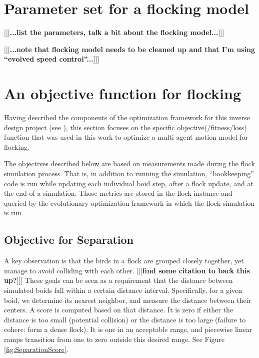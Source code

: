 \documentclass[letterpaper]{article}
\begin{document}
\section{Parameter set for a flocking model}
\label{sec:parameter_set}

[[[\textbf{...list the parameters, talk a bit about the flocking model...}]]]

[[[\textbf{...note that flocking model needs to be cleaned up and that I'm using ``evolved speed control''...}]]]

\section{An objective function for flocking}
\label{sec:FlockingObjective}

Having described the components of the optimization framework for this inverse design project (see ), this section focuses on the specific objective(/fitness/loss) function that was used in this work to optimize a multi-agent motion model for flocking.

The objectives described below are based on measurements made during the flock simulation process. That is, in addition to running the simulation, ``bookkeeping'' code is run while updating each individual boid step, after a flock update, and at the end of a simulation. Those metrics are stored in the flock instance and queried by the evolutionary optimization framework in which the flock simulation is run.

\subsection{Objective for Separation}
\label{subsec:separation_objective}

A key observation is that the birds in a flock are grouped closely together, yet manage to avoid colliding with each other. [[[\textbf{find some citation to back this up?}]]] These goals can be seen as a requirement that the distance between simulated boids fall within a certain distance interval. Specifically, for a given boid, we determine its nearest neighbor, and measure the distance between their centers. A score is computed based on that distance. It is zero if either the distance is too small (potential collision) or the distance is too large (failure to cohere: form a dense flock). It is one in an acceptable range, and piecewise linear ramps transition from one to zero outside this desired range. See Figure \ref{fig:SeparationScore}.
\end{document}
